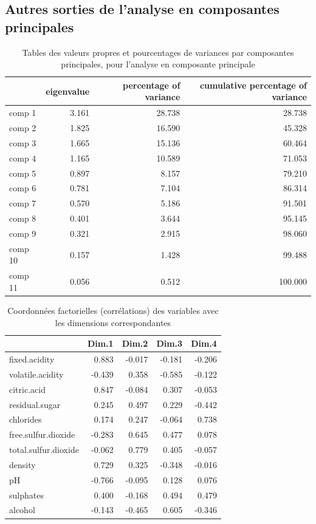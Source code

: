 \documentclass[11pt,a4paper]{article}
\begin{document}
\subsection{Autres sorties de l'analyse en composantes principales}
\label{sec:eigpca}
\begin{table}[h]
	\centering
	\begin{tabular}{lrrr}
		\hline
		& eigenvalue & percentage of variance & cumulative percentage of variance \\ 
		\hline
		comp 1 & 3.161 & 28.738 & 28.738 \\ 
		comp 2 & 1.825 & 16.590 & 45.328 \\ 
		comp 3 & 1.665 & 15.136 & 60.464 \\ 
		comp 4 & 1.165 & 10.589 & 71.053 \\ 
		comp 5 & 0.897 & 8.157 & 79.210 \\ 
		comp 6 & 0.781 & 7.104 & 86.314 \\ 
		comp 7 & 0.570 & 5.186 & 91.501 \\ 
		comp 8 & 0.401 & 3.644 & 95.145 \\ 
		comp 9 & 0.321 & 2.915 & 98.060 \\ 
		comp 10 & 0.157 & 1.428 & 99.488 \\ 
		comp 11 & 0.056 & 0.512 & 100.000 \\ 
		\hline
	\end{tabular}
	\caption{Tables des valeurs propres et pourcentages de variances par composantes principales, pour l'analyse en composante principale}
	\label{table:eigpca}
\end{table}
\begin{table}[h]
	\centering
	\begin{tabular}{lrrrr}
		\hline
		& Dim.1 & Dim.2 & Dim.3 & Dim.4 \\ 
		\hline
		fixed.acidity & 0.883 & -0.017 & -0.181 & -0.206 \\ 
		volatile.acidity & -0.439 & 0.358 & -0.585 & -0.122 \\ 
		citric.acid & 0.847 & -0.084 & 0.307 & -0.053 \\ 
		residual.sugar & 0.245 & 0.497 & 0.229 & -0.442 \\ 
		chlorides & 0.174 & 0.247 & -0.064 & 0.738 \\ 
		free.sulfur.dioxide & -0.283 & 0.645 & 0.477 & 0.078 \\ 
		total.sulfur.dioxide & -0.062 & 0.779 & 0.405 & -0.057 \\ 
		density & 0.729 & 0.325 & -0.348 & -0.016 \\ 
		pH & -0.766 & -0.095 & 0.128 & 0.076 \\ 
		sulphates & 0.400 & -0.168 & 0.494 & 0.479 \\ 
		alcohol & -0.143 & -0.465 & 0.605 & -0.346 \\ 
		\hline
	\end{tabular}

\caption{Coordonnées factorielles (corrélations) des variables avec les dimensions correspondantes}
\label{table:corpca}
\end{table}
\end{document}
